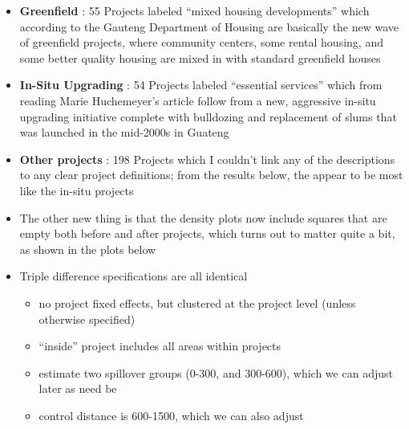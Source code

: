 \documentclass[12pt]{article}
\begin{document}
\begin{itemize}

    \item \textbf{Greenfield} : 55 Projects labeled ``mixed housing developments'' which according to the Gauteng Department of Housing are basically the new wave of greenfield projects, where community centers, some rental housing, and some better quality housing are mixed in with standard greenfield houses
    \item \textbf{In-Situ Upgrading} : 54 Projects labeled ``essential services'' which from reading Marie Huchemeyer's article follow from a new, aggressive in-situ upgrading initiative complete with bulldozing and replacement of slums that was launched in the mid-2000s in Guateng
    \item \textbf{Other projects} : 198 Projects which I couldn't link any of the descriptions to any clear project definitions; from the results below, the appear to be most like the in-situ projects 
    \item The other new thing is that the density plots now include squares that are empty both before and after projects, which turns out to matter quite a bit, as shown in the plots below

    \item Triple difference specifications are all identical
        \begin{itemize}
            \item no project fixed effects, but clustered at the project level (unless otherwise specified)
            \item ``inside'' project includes all areas within projects
            \item estimate two spillover groups (0-300, and 300-600), which we can adjust later as need be
            \item control distance is 600-1500, which we can also adjust
        \end{itemize}

\end{itemize}
\end{document}
